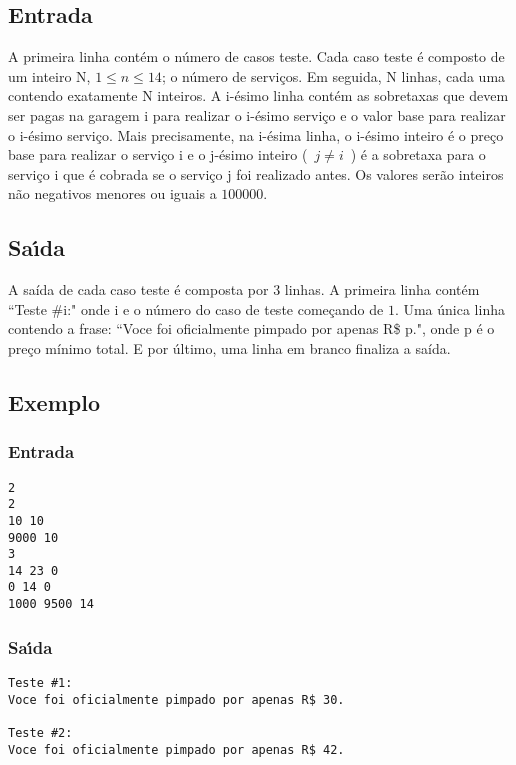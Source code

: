\documentclass[14pt]{article}
\begin{document}
\subsection{Entrada}
A primeira linha cont\'em o n\'umero de casos teste. Cada caso teste \'e composto de um inteiro N, $1 \leqslant n \leqslant 14$; o n\'umero de servi\c{c}os. Em seguida, N linhas, cada uma contendo exatamente N inteiros. A i-\'esimo linha cont\'em as sobretaxas que devem ser pagas na garagem i para realizar o i-\'esimo servi\c{c}o e o valor base para realizar o i-\'esimo servi\c{c}o. Mais precisamente, na i-\'esima linha, o i-\'esimo inteiro \'e o pre\c{c}o base para realizar o servi\c{c}o i e o j-\'esimo inteiro (\ $j \neq i$\ ) \'e a sobretaxa para o servi\c{c}o i que \'e cobrada se o servi\c{c}o j foi realizado antes. Os valores ser\~ao inteiros n\~ao negativos menores ou iguais a $100000$.


\subsection{Sa\'{\i}da}
A sa\'ida de cada caso teste \'e composta por $3$ linhas.
A primeira linha cont\'em  ``Teste \#i:" onde i e o n\'umero do caso de teste come\c{c}ando de $1$.
Uma \'unica linha contendo a frase: “Voce foi oficialmente pimpado por apenas R\$ p.", onde p \'e o pre\c{c}o m\'inimo total.
E por \'ultimo, uma linha em branco finaliza a sa\'ida.

\subsection{Exemplo}
\subsubsection{Entrada}
\begin{verbatim}
2
2
10 10
9000 10
3
14 23 0
0 14 0
1000 9500 14
 \end{verbatim}
\subsubsection{Sa\'{\i}da}
 \begin{verbatim}
Teste #1:
Voce foi oficialmente pimpado por apenas R$ 30.

Teste #2:
Voce foi oficialmente pimpado por apenas R$ 42.

 \end{verbatim}
\end{document}

